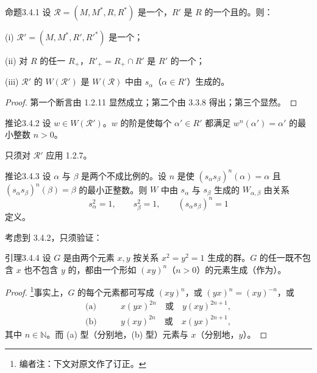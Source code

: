 \begin{SGAresult}{命题}{3.4.1}
设 $\mathscr R=(M,M^*,R,R^*)$ 是一个，$R'$ 是 $R$ 的一个且的。则：

(i) $\mathscr R'=(M,M^*,R',R'^*)$ 是一个；

(ii) 对 $R$ 的任一 $R_+$，$R'_+=R_+\cap R'$ 是 $R'$ 的一个；

(iii) $\mathscr R'$ 的 $W(\mathscr R')$ 是 $W(\mathscr R)$ 中由 $s_\alpha$（$\alpha\in R'$）生成的。
\end{SGAresult}
\begin{proof}
第一个断言由 1.2.11 显然成立；第二个由 3.3.8 得出；第三个显然。
\end{proof}
\begin{SGAresult}{推论}{3.4.2}
设 $w\in W(\mathscr R')$。$w$ 的阶是使每个 $\alpha'\in R'$ 都满足 $w^n(\alpha')=\alpha'$ 的最小整数 $n>0$。
\end{SGAresult}
只须对 $\mathscr R'$ 应用 1.2.7。
\begin{SGAresult}{推论}{3.4.3}
设 $\alpha$ 与 $\beta$ 是两个不成比例的。设 $n$ 是使 $(s_\alpha s_\beta)^n(\alpha)=\alpha$ 且 $(s_\alpha s_\beta)^n(\beta)=\beta$ 的最小正整数。则 $W$ 中由 $s_\alpha$ 与 $s_\beta$ 生成的 $W_{\alpha,\beta}$ 由关系
\[s_\alpha^2=1,\qquad s_\beta^2=1,\qquad(s_\alpha s_\beta)^n=1\]
定义。
\end{SGAresult}
考虑到 3.4.2，只须验证：
\begin{SGAresult}{引理}{3.4.4}
设 $G$ 是由两个元素 $x,y$ 按关系 $x^2=y^2=1$ 生成的群。$G$ 的任一既不包含 $x$ 也不包含 $y$ 的，都由一个形如 $(xy)^n$（$n>0$）的元素生成（作为）。
\end{SGAresult}
\begin{proof}
\footnote{编者注：下文对原文作了订正。}事实上，$G$ 的每个元素都可写成 $(xy)^n$，或 $(yx)^n=(xy)^{-n}$，或
\begin{align*}
\text{(a)}&\qquad x(yx)^{2n}\quad\text{或}\quad y(xy)^{2n+1},\\
\text{(b)}&\qquad y(xy)^{2n}\quad\text{或}\quad x(yx)^{2n+1},
\end{align*}
其中 $n\in\mathbb N$。而 (a) 型（分别地，(b) 型）元素与 $x$（分别地，$y$）。
\end{proof}

